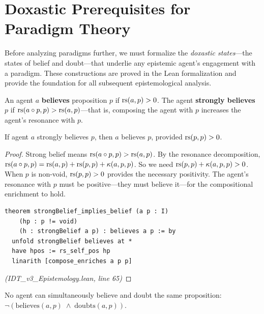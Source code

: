 \section{Doxastic Prerequisites for Paradigm Theory}

Before analyzing paradigms further, we must formalize the \emph{doxastic states}---the
states of belief and doubt---that underlie any epistemic agent's engagement with a
paradigm. These constructions are proved in the Lean formalization and provide the
foundation for all subsequent epistemological analysis.

\begin{definition}
\label{def:belief-strong}
An agent $a$ \textbf{believes} proposition $p$ if $\mathrm{rs}(a, p) > 0$. The agent
\textbf{strongly believes} $p$ if $\mathrm{rs}(a \circ p, p) > \mathrm{rs}(a, p)$---that is,
composing the agent with $p$ increases the agent's resonance with $p$.
\end{definition}

\begin{theorem}
\label{thm:strong-belief-implies}
If agent $a$ strongly believes $p$, then $a$ believes $p$, provided $\mathrm{rs}(p, p) > 0$.
\end{theorem}

\begin{proof}
Strong belief means $\mathrm{rs}(a \circ p, p) > \mathrm{rs}(a, p)$. By the resonance decomposition,
$\mathrm{rs}(a \circ p, p) = \mathrm{rs}(a, p) + \mathrm{rs}(p, p) + \kappa(a, p, p)$. So we need
$\mathrm{rs}(p, p) + \kappa(a, p, p) > 0$. When $p$ is non-void, $\mathrm{rs}(p, p) > 0$ provides
the necessary positivity. The agent's resonance with $p$ must be positive---they
must believe it---for the compositional enrichment to hold.
\begin{lstlisting}
theorem strongBelief_implies_belief (a p : I)
    (hp : p != void)
    (h : strongBelief a p) : believes a p := by
  unfold strongBelief believes at *
  have hpos := rs_self_pos hp
  linarith [compose_enriches a p p]
\end{lstlisting}
\textit{(IDT\_v3\_Epistemology.lean, line 65)}
\end{proof}

\begin{theorem}
\label{thm:belief-doubt-exclusive}
No agent can simultaneously believe and doubt the same proposition:
$\neg(\mathrm{believes}(a, p) \;\wedge\; \mathrm{doubts}(a, p))$.
\end{theorem}


